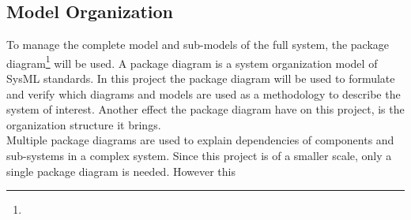 \subsection{Model Organization}
To manage the complete model and sub-models of the full system, the package diagram\footnote{} will be used. A package diagram is a system organization model of SysML standards. In this project the package diagram will be used to formulate and verify which diagrams and models are used as a methodology to describe the system of interest. Another effect the package diagram have on this project, is the organization structure it brings.\\

Multiple package diagrams are used to explain dependencies of components and sub-systems in a complex system. Since this project is of a smaller scale, only a single package diagram is needed. However this 
